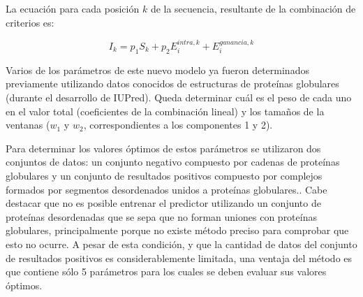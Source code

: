 La ecuación para cada posición $k$ de la secuencia, resultante de la combinación de criterios es:

\begin{equation}\label{scorefinal}
I_k = p_1S_k + p_2E_i^{intra,k} + E_i^{ganancia,k}
\end{equation}


Varios de los parámetros de este nuevo modelo ya fueron determinados previamente utilizando datos conocidos de estructuras de proteínas globulares (durante el desarrollo de IUPred).
Queda determinar cuál es el peso de cada uno en el valor total (coeficientes de la combinación lineal) y los tamaños de la ventanas ($w_1$ y $w_2$, correspondientes a los componentes 1 y 2).

Para determinar los valores óptimos de estos parámetros se utilizaron dos conjuntos de datos: un conjunto negativo compuesto por cadenas de proteínas globulares y un conjunto de resultados positivos compuesto por complejos formados por segmentos desordenados unidos a proteínas globulares..
Cabe destacar que no es posible entrenar el predictor utilizando un conjunto de proteínas desordenadas que se sepa que no forman uniones con proteínas globulares, 
principalmente porque no existe método preciso para comprobar que esto no ocurre. 
A pesar de esta condición, y que la cantidad de datos del conjunto de resultados positivos es considerablemente limitada, una ventaja del método es que contiene sólo 5 parámetros para los cuales se deben evaluar sus valores óptimos. 


